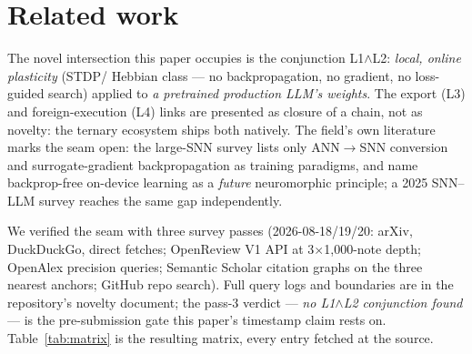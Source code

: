 \section{Related work}
\label{sec:related}

The novel intersection this paper occupies is the conjunction
L1$\wedge$L2: \allowbreak \emph{local, online plasticity} (STDP/\allowbreak
Hebbian class --- no backpropagation, no gradient, no loss-guided search) applied to
\emph{a pretrained production LLM's weights}. The export (L3) and
foreign-execution (L4) links are presented as closure of a chain, not
as novelty: the ternary ecosystem ships both natively. The field's
own literature marks the seam open: the large-SNN survey
\citep{surveylargesnn} lists only ANN$\to$SNN conversion and
surrogate-gradient backpropagation as training paradigms, and
\citet{rajendran2023future} name backprop-free on-device learning as
a \emph{future} neuromorphic principle; a 2025 SNN--LLM survey
reaches the same gap independently.

We verified the seam with three survey passes (2026-08-18/19/20:
arXiv, DuckDuckGo, direct fetches; OpenReview V1 API at
3$\times$1{,}000-note depth; OpenAlex precision queries; Semantic
Scholar citation graphs on the three nearest anchors; GitHub repo
search). Full query logs and boundaries are in the repository's
novelty document; the pass-3 verdict --- \emph{no L1$\wedge$L2
conjunction found} --- is the pre-submission gate this paper's
timestamp claim rests on. Table~\ref{tab:matrix} is the resulting
matrix, every entry fetched at the source.

